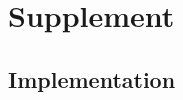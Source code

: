 \documentclass{bioinfo}
\theoremstyle{definition}
\newcommand{\beginsupplement}{%
	\setcounter{table}{0}
	\renewcommand{\thetable}{S\arabic{table}}%
	\setcounter{figure}{0}
	\renewcommand{\thefigure}{S\arabic{figure}}%
}
\begin{document}
	\vspace{-0.6cm}
	
%	
		
	
	
	
	
	\clearpage
	\setcounter{page}{1}
	
	\beginsupplement
	
	\section{Supplement}
	
	\subsection{Implementation}
	\label{implementation}
	
\end{document}
